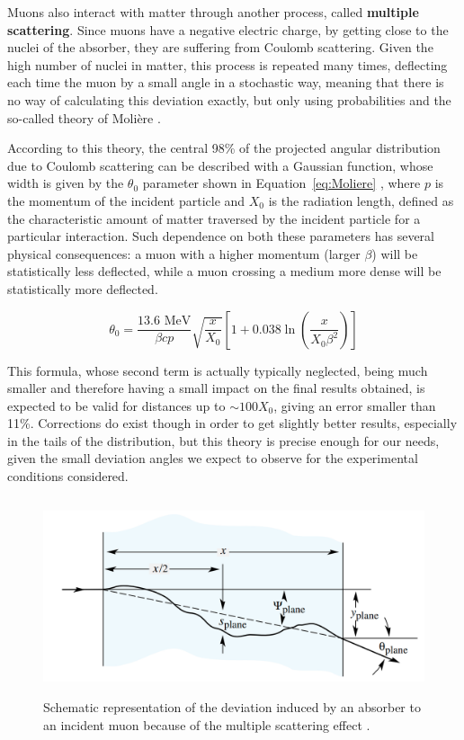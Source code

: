 \documentclass[a4paper, 11pt]{report}
\begin{document}
Muons also interact with matter through another process, called \textbf{multiple scattering}. Since muons have a negative electric charge, by getting close to the nuclei of the absorber, they are suffering from Coulomb scattering. Given the high number of nuclei in matter, this process is repeated many times, deflecting each time the muon by a small angle in a stochastic way, meaning that there is no way of calculating this deviation exactly, but only using probabilities and the so-called theory of Moli\`ere \cite{Moliere}.

According to this theory, the central 98\% of the projected angular distribution due to Coulomb scattering can be described with a Gaussian function, whose width is given by the $\theta_0$ parameter shown in Equation~\ref{eq:Moliere} \cite{PDGScat}, where $p$ is the momentum of the incident particle and $X_0$ is the radiation length, defined as the characteristic amount of matter traversed by the incident particle for a particular interaction. Such dependence on both these parameters has several physical consequences: a muon with a higher momentum (larger $\beta$) will be statistically less deflected, while a muon crossing a medium more dense will be statistically more deflected.

\begin{equation}
\label{eq:Moliere}
\theta_0 = \frac{13.6 \text{ MeV}}{\beta c p} \sqrt{\frac{x}{X_0}} \left [1 + 0.038 \ln \left (\frac{x}{X_0 \beta^2} \right ) \right ]
\end{equation}

This formula, whose second term is actually typically neglected, being much smaller and therefore having a small impact on the final results obtained, is expected to be valid for distances up to $\sim 100 X_0$, giving an error smaller than 11\%. Corrections do exist though in order to get slightly better results, especially in the tails of the distribution, but this theory is precise enough for our needs, given the small deviation angles we expect to observe for the experimental conditions considered.

\begin{figure}[htbp]
\begin{center}
\includegraphics[width=12.5cm, height=5.8cm]{figs/moliere.png}
\caption{Schematic representation of the deviation induced by an absorber to an incident muon because of the multiple scattering effect \cite{PDGScat}.}
\label{figure:Moliere}
\end{center}
\end{figure}
\end{document}
